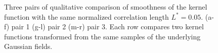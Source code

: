 \begin{figure}[!htb]
\begin{subfigure}[b]{0.15\textwidth}
    \caption{}
    \label{fig: Chapter4/2D/d_exp_cartesian_5_5_rho_0_seed_e}
  \end{subfigure}
  \caption{ Three pairs of qualitative comparison of smoothness of the kernel function with the same normalized  correlation length $L^* = 0.05$. (a-f) pair 1 (g-l) pair 2 (m-r) pair 3. Each row compares two kernel functions transformed from the same samples of the underlying Gaussian fields. }
  \label{fig: Chapter4/2D/compare_smoothness}
\end{figure}
